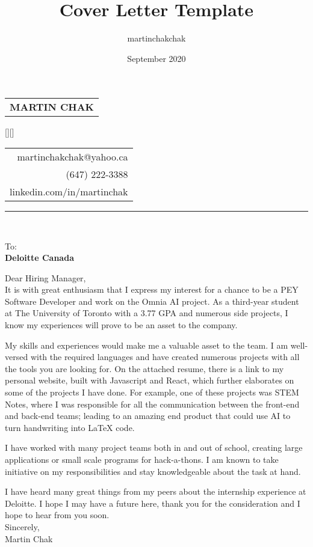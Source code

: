 \documentclass[12pt,letterpaper]{article}
\title{Cover Letter Template}
\author{martinchakchak }
\date{September 2020}
\begin{document}
\noindent
\begin{spacing}{1.125}
    \vfill\noindent
    \begin{tabular}[t]{@{}l} 
      \MakeUppercase{\fontsize{18pt}{5pt}\bf Martin Chak}
    \end{tabular}
    \hfill
    \hspace*{7.5cm}
    \raisebox{0.15cm}[\height][\depth]{
        \begin{tabular}[t]{r}
            martinchakchak@yahoo.ca\\
            (647) 222-3388\\
            linkedin.com/in/martinchak
        \end{tabular}
    }
\end{spacing}

\hrule



\noindent\\

\noindent
{\fontsize{10pt}{5pt}To:}\\
{\bf Deloitte Canada}\\

\begin{text}
    Dear Hiring Manager,\\
    
    It is with great enthusiasm that I express my interest for a chance to be a PEY Software Developer and work on the Omnia AI project. As a third-year student at The University of Toronto with a 3.77 GPA and numerous side projects, I know my experiences will prove to be an asset to the company.
    
    My skills and experiences would make me a valuable asset to the team. I am well-versed with the required languages and have created numerous projects with all the tools you are looking for. On the attached resume, there is a link to my personal website, built with Javascript and React, which further elaborates on some of the projects I have done. For example, one of these projects was STEM Notes, where I was responsible for all the communication between the front-end and back-end teams; leading to an amazing end product that could use AI to turn handwriting into LaTeX code.
    
    I have worked with many project teams both in and out of school, creating large applications or small scale programs for hack-a-thons. I am known to take initiative on my responsibilities and stay knowledgeable about the task at hand.
    
    I have heard many great things from my peers about the internship experience at Deloitte. I hope I may have a future here, thank you for the consideration and I hope to hear from you soon.\\
    
    Sincerely,\\
    Martin Chak
\end{text}
\end{document}
